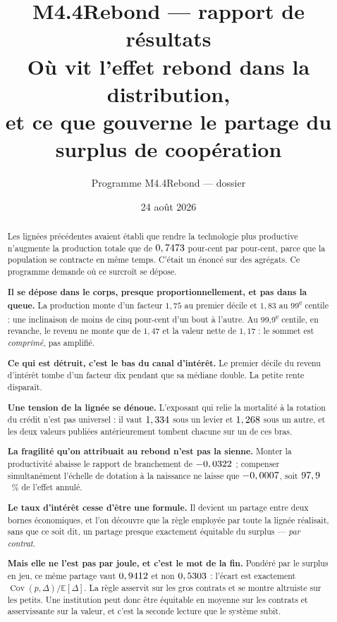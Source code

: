\documentclass[11pt,a4paper]{article}
\title{M4.4Rebond --- rapport de résultats\\
\large Où vit l'effet rebond dans la distribution,\\
et ce que gouverne le partage du surplus de coopération}
\author{Programme M4.4Rebond --- dossier \code{m4\_4\_rebond\_credit\_soc}}
\date{24 août 2026}
\begin{document}
\maketitle

\begin{abstract}
Les lignées précédentes avaient établi que rendre la technologie plus
productive n'augmente la production totale que de $0,7473$ pour-cent par
pour-cent, parce que la population se contracte en même temps. C'était un
énoncé sur des agrégats. Ce programme demande où ce surcroît se dépose.

\textbf{Il se dépose dans le corps, presque proportionnellement, et pas dans
la queue.} La production monte d'un facteur $1{,}75$ au premier décile et
$1{,}83$ au 99\textsuperscript{e} centile : une inclinaison de moins de cinq
pour-cent d'un bout à l'autre. Au 99,9\textsuperscript{e} centile, en
revanche, le revenu ne monte que de $1{,}47$ et la valeur nette de $1{,}17$ :
le sommet est \emph{comprimé}, pas amplifié.

\textbf{Ce qui est détruit, c'est le bas du canal d'intérêt.} Le premier
décile du revenu d'intérêt tombe d'un facteur dix pendant que sa médiane
double. La petite rente disparaît.

\textbf{Une tension de la lignée se dénoue.} L'exposant qui relie la
mortalité à la rotation du crédit n'est pas universel : il vaut
$1,334$ sous un levier et $1,268$ sous
un autre, et les deux valeurs publiées antérieurement tombent chacune sur un
de ces bras.

\textbf{La fragilité qu'on attribuait au rebond n'est pas la sienne.} Monter
la productivité abaisse le rapport de branchement de
$-0,0322$ ; compenser simultanément l'échelle de dotation à la
naissance ne laisse que $-0,0007$, soit
$97,9$~\% de l'effet annulé.

\textbf{Le taux d'intérêt cesse d'être une formule.} Il devient un partage
entre deux bornes économiques, et l'on découvre que la règle employée par
toute la lignée réalisait, sans que ce soit dit, un partage presque
exactement équitable du surplus --- \emph{par contrat}.

\textbf{Mais elle ne l'est pas par joule, et c'est le mot de la fin.} Pondéré
par le surplus en jeu, ce même partage vaut $0,9412$ et non
$0,5303$ : l'écart est exactement
$\operatorname{Cov}(p,\Delta)/\mathbb{E}[\Delta]$. La règle asservit sur les
gros contrats et se montre altruiste sur les petits. Une institution peut
donc être équitable en moyenne sur les contrats et asservissante sur la
valeur, et c'est la seconde lecture que le système subit.
\end{abstract}
\end{document}
